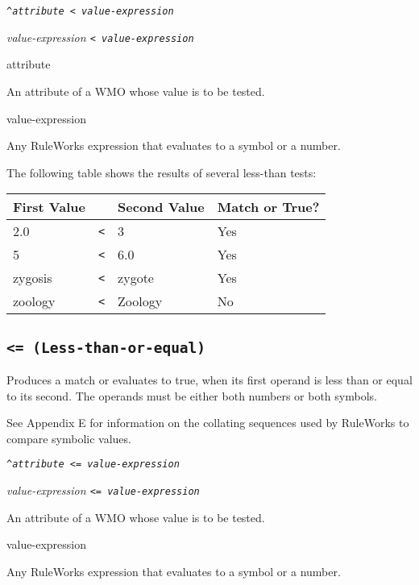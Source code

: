 \Format

\tt{\^}\it{attribute} \tt< \it{value-expression}

\it{value-expression} \tt< \it{value-expression}

\begin{operands}
\item[\ct attribute]

  An attribute of a WMO whose value is to be tested.

\item[value-expression]

  Any RuleWorks expression that evaluates to a symbol or a number.
\end{operands}

\Example

The following table shows the results of several less-than tests:

\begin{center}
\begin{tabular}{lcll}
  \toprule
  First Value &   & Second Value & Match or True? \\
  \midrule
  2.0         & \verb|<| & 3            & Yes \\
  5           & \verb|<| & 6.0          & Yes \\
  zygosis     & \verb|<| & zygote       & Yes \\
  zoology     & \verb|<| & Zoology      & No \\
  \bottomrule
\end{tabular}
\end{center}

\subsection{\tt{<=} (Less-than-or-equal)}

Produces a match or evaluates to true, when its first operand is less
than or equal to its second. The operands must be either both numbers
or both symbols.

See Appendix E for information on the collating sequences used by
RuleWorks to compare symbolic values.

\Format

\tt{\^}\it{attribute} \tt{<=} \it{value-expression}

\it{value-expression} \tt{<=} \it{value-expression}

\begin{operands}
\item[\ct{attribute}]

  An attribute of a WMO whose value is to be tested.

\item[value-expression]

  Any RuleWorks expression that evaluates to a symbol or a number.
\end{operands}

